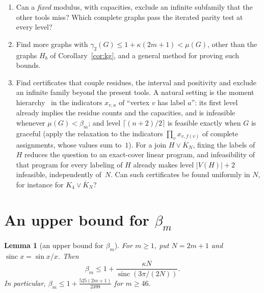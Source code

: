 \documentclass[11pt]{amsart}
\newcommand{\thmmarker}{}
\newcommand{\mgpt}{\gdef\thmmarker{\textsuperscript{$\dagger$}}}
\theoremstyle{tplain}
\newtheorem{lemma}[theorem]{Lemma}
\theoremstyle{tdefinition}
\theoremstyle{tremark}
\begin{document}
\begin{enumerate}
  $n\ge13$ for every $r$ (Section~\ref{sec:provenance}); what are the
  thresholds for $r\ge4$?
\item Can a \emph{fixed} modulus, with capacities, exclude an infinite
  subfamily that the other tools miss? Which complete graphs pass the iterated
  parity test at every level?
\item Find more graphs with $\gamma_2(G)\le1+\kappa(2m+1)<\mu(G)$, other than the graphs $H_b$ of Corollary~\ref{cor:kg}, and a general method
  for proving such bounds.
\item Find certificates that couple residues, the interval and positivity
  and exclude an infinite family beyond the present tools. A natural setting
  is the moment hierarchy~\cite{lasserre01,laurent03} in the indicators
  $x_{v,a}$ of ``vertex $v$ has label $a$'': its first level already implies the residue counts and the capacities, and
  is infeasible whenever $\mu(G)<\beta_m$; and level $\lceil(n+2)/2\rceil$ is feasible exactly when $G$ is graceful
  (apply the relaxation to the indicators $\prod_vx_{v,f(v)}$ of complete
  assignments, whose values sum to~$1$). For a join $H\vee\overline
  K_N$, fixing the labels of $H$ reduces the question to an exact-cover
  linear program, and infeasibility of that program for every labeling of $H$
  already makes level $|V(H)|+2$ infeasible, independently of~$N$. Can such
  certificates be found uniformly in $N$, for instance for
  $K_4\vee\overline K_N$?
\end{enumerate}

\appendix

\section{An upper bound for \texorpdfstring{$\beta_m$}{beta(m)}}

\mgpt\begin{lemma}[an upper bound for $\beta_m$]\label{lem:betabound}
For $m\ge1$, put $N=2m+1$ and $\operatorname{sinc}x=\sin x/x$. Then
\[
 \beta_m\le1+\frac{\kappa N}{\operatorname{sinc}(3\pi/(2N))}.
\]
In particular, $\beta_m\le1+\frac{525(2m+1)}{2399}$ for $m\ge46$.
\end{lemma}
\end{document}
